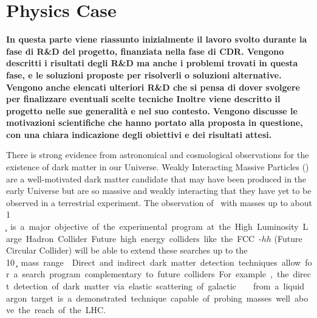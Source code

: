\section{Physics Case}
\label{sec:PhysicsCase}


{\bf\color{red} In questa parte viene riassunto inizialmente il lavoro svolto durante la fase di R\&D del progetto, finanziata nella fase di CDR. Vengono descritti i risultati degli R\&D ma anche i problemi trovati in questa fase, e le soluzioni proposte per risolverli o soluzioni alternative. Vengono anche elencati ulteriori R\&D che si pensa di dover svolgere per finalizzare eventuali scelte tecniche
Inoltre viene descritto il progetto nelle sue generalità e nel suo contesto. Vengono discusse le motivazioni scientifiche che hanno portato alla proposta in questione, con una chiara indicazione degli obiettivi e dei risultati attesi.}

\vspace{1cm}

There is strong evidence from astronomical and cosmological observations for the existence of dark matter in our Universe. Weakly Interacting Massive Particles (\WIMPs) are a well-motivated dark matter candidate that may have been produced in the early Universe but are so massive and weakly interacting that they have yet to be observed in a terrestrial experiment. The observation of \WIMPs\ with masses up to about 1 \si{\TeV\per\square\c} is a major objective of the experimental program at the High Luminosity Large Hadron Collider. Future high energy colliders like the FCC-$hh$ (Future Circular Collider) will be able to extend these searches up to the  \SI{10}{\TeV\per\square\c} mass range~\cite{CERN:2017cq}. Direct and indirect dark matter detection techniques allow for a search program complementary to future colliders. For example, the direct detection of dark matter via elastic scattering of galactic \WIMPs\ from a liquid argon target is a demonstrated technique capable of probing masses well above the reach of the LHC.

